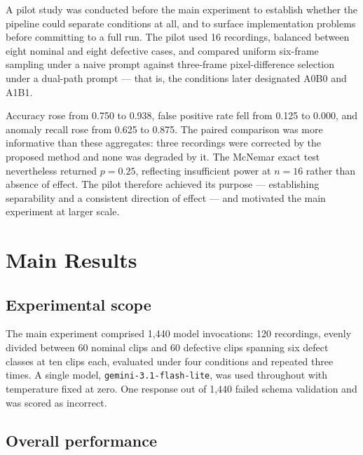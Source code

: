 A pilot study was conducted before the main experiment to establish
whether the pipeline could separate conditions at all, and to surface
implementation problems before committing to a full run. The pilot used 16
recordings, balanced between eight nominal and eight defective cases, and
compared uniform six-frame sampling under a naive prompt against
three-frame pixel-difference selection under a dual-path prompt --- that
is, the conditions later designated A0B0 and A1B1.

Accuracy rose from 0.750 to 0.938, false positive rate fell from 0.125 to
0.000, and anomaly recall rose from 0.625 to 0.875. The paired comparison
was more informative than these aggregates: three recordings were
corrected by the proposed method and none was degraded by it. The McNemar
exact test nevertheless returned $p = 0.25$, reflecting insufficient power
at $n = 16$ rather than absence of effect. The pilot therefore achieved
its purpose --- establishing separability and a consistent direction of
effect --- and motivated the main experiment at larger scale.


\section{Main Results}
\label{sec:mainresults}

\subsection{Experimental scope}

The main experiment comprised 1{,}440 model invocations: 120 recordings,
evenly divided between 60 nominal clips and 60 defective clips spanning
six defect classes at ten clips each, evaluated under four conditions and
repeated three times. A single model, \texttt{gemini-3.1-flash-lite}, was
used throughout with temperature fixed at zero. One response out of
1{,}440 failed schema validation and was scored as incorrect.

\subsection{Overall performance}

